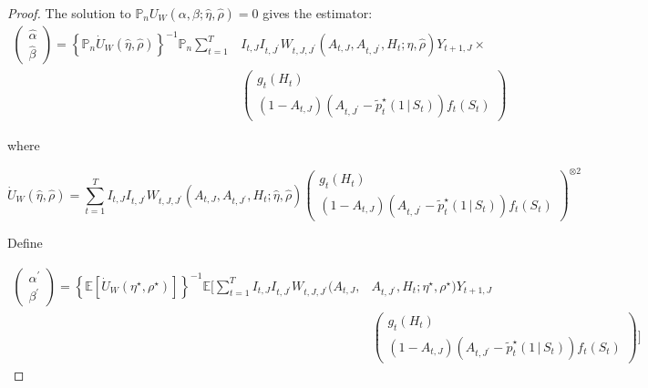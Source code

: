 \documentclass[supplementary, lineno]{biometrika}
\def\E{\mathbb{E}}
\def\P{\mathbb{P}}
\def\given{\, | \,}
\begin{document}
\begin{proof}
The solution to $\P_n U_W(\alpha,\beta;\hat\eta,\hat\rho) = 0$ gives the estimator:
\begin{align*}
    \begin{pmatrix}
  \hat \alpha \\
  \hat \beta
\end{pmatrix} =
\left\{ \P_n \dot U_W(\hat\eta,\hat\rho) \right \}^{-1} \P_n \sum_{t=1}^T &I_{t,J}I_{t,J^\prime} W_{t,J, J^\prime}(A_{t,J},A_{t,J^\prime},H_t; \hat \eta,\hat \rho) Y_{t+1,J} \times \\
&\begin{pmatrix}
  g_t(H_t) \\
  (1-A_{t,J})(A_{t,J^\prime} - \tilde {p}^\star_t (1 \given S_t) ) f_t (S_t)
\end{pmatrix}
\end{align*}


where

\[
\dot U_W(\hat\eta,\hat\rho) = \sum_{t=1}^T I_{t,J}I_{t,J^\prime}W_{t,J, J^\prime}(A_{t,J},A_{t,J^\prime},H_t; \hat\eta,\hat\rho) \begin{pmatrix}
  g_t(H_t) \\
  (1-A_{t,J})(A_{t,J^\prime} - \tilde {p}^\star_t (1 \given S_t) ) f_t (S_t)
\end{pmatrix}^ {\otimes 2}
\]

Define

\begin{align*}
    \begin{pmatrix}
  \alpha^\prime \\
  \beta^\prime
\end{pmatrix} = \left\{ \E \left[ \dot U_W(\eta^\star,\rho^\star) \right]\right\}^{-1}  \E \Bigg[ \sum_{t=1}^T I_{t,J}I_{t,J^\prime} W_{t,J, J^\prime}(A_{t,J},&A_{t,J^\prime},H_t; \eta^\star,\rho^\star) Y_{t+1,J} \nonumber \\
&\begin{pmatrix}
  g_t(H_t) \\
  (1-A_{t,J})(A_{t,J^\prime} - \tilde {p}^\star_t (1 \given S_t) ) f_t (S_t)
\end{pmatrix} \Bigg]
\end{align*}



\end{proof}
\end{document}
